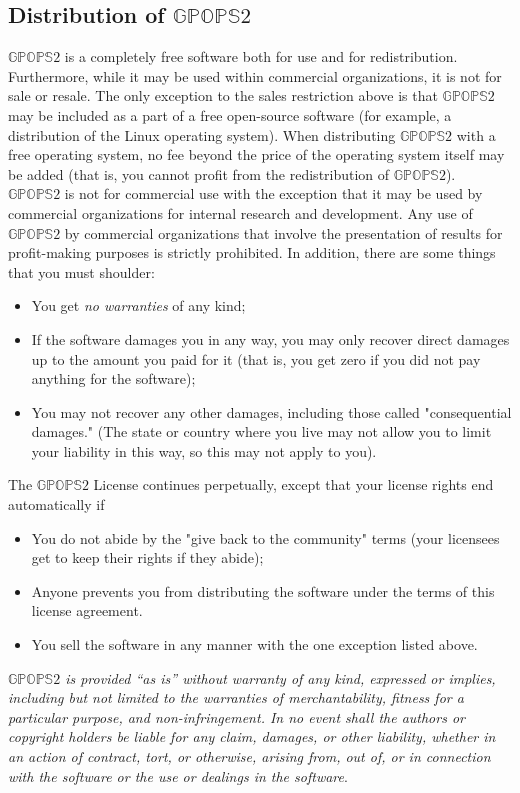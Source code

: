 \subsection*{Distribution of $\mathbb{GPOPS}2$}

$\mathbb{GPOPS}2$ is a completely free software both for use and for
redistribution.  Furthermore, while it may be used within commercial
organizations, it is not for sale or resale.  The only exception to
the sales restriction above is that $\mathbb{GPOPS}2$ may be included as a part of
a free open-source software (for example, a distribution of the Linux
operating system).  When distributing $\mathbb{GPOPS}2$ with a free
operating system, no fee beyond the price of the operating system
itself may be added (that is, you cannot profit from the
redistribution of $\mathbb{GPOPS}2$). $\mathbb{GPOPS}2$ is not for commercial use with
the exception that it may be used by commercial organizations for
internal research and development.  Any use of $\mathbb{GPOPS}2$ by commercial
organizations that involve the presentation of results for
profit-making purposes is strictly prohibited.  In addition, there are
some things that you must shoulder:
\begin{itemize}
\item You get {\em no warranties} of any kind;
\item If the software damages you in any way, you may only recover
direct damages up to the amount you paid for it (that is, you get zero
if you did not pay anything for the software);
\item You may not recover any other damages, including those called
"consequential damages." (The state or country where you live may not
allow you to limit your liability in this way, so this may not apply
to you).
\end{itemize}
The $\mathbb{GPOPS}2$ License continues perpetually, except that your license
rights end automatically if
\begin{itemize}
\item You do not abide by the "give back to the community" terms (your
licensees get to keep their rights if they abide);
\item Anyone prevents you from distributing the software under the
terms of this license agreement.
\item You sell the software in any manner with the one exception
listed above.
\end{itemize}

{\em $\mathbb{GPOPS}2$ is provided ``as is'' without warranty
of any kind, expressed or implies, including but not limited to the 
warranties of merchantability, fitness for a particular purpose, and
non-infringement.  In no event shall the authors or copyright holders
be liable for any claim, damages, or other liability, whether in an
action of contract, tort, or otherwise, arising from, out of, or in
connection with the software or the use or dealings in the software}.
